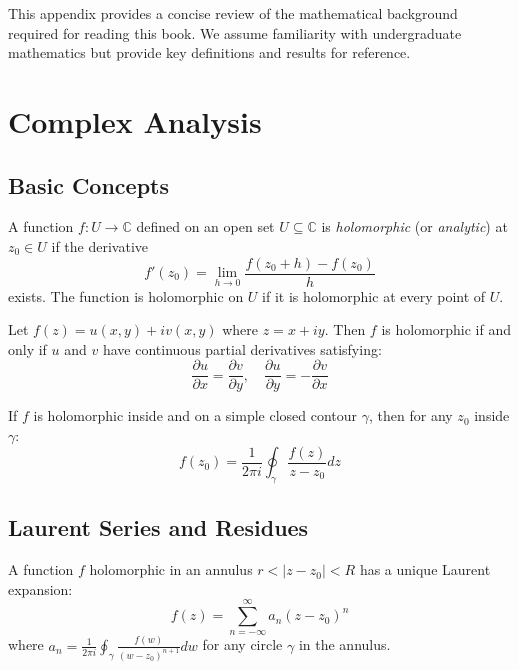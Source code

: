 
This appendix provides a concise review of the mathematical background required for reading this book. We assume familiarity with undergraduate mathematics but provide key definitions and results for reference.

\section{Complex Analysis}

\subsection{Basic Concepts}

\begin{definition}
A function $f: U \to \mathbb{C}$ defined on an open set $U \subseteq \mathbb{C}$ is \emph{holomorphic} (or \emph{analytic}) at $z_0 \in U$ if the derivative
\[
f'(z_0) = \lim_{h \to 0} \frac{f(z_0 + h) - f(z_0)}{h}
\]
exists. The function is holomorphic on $U$ if it is holomorphic at every point of $U$.
\end{definition}

\begin{theorem}
Let $f(z) = u(x,y) + iv(x,y)$ where $z = x + iy$. Then $f$ is holomorphic if and only if $u$ and $v$ have continuous partial derivatives satisfying:
\[
\frac{\partial u}{\partial x} = \frac{\partial v}{\partial y}, \quad \frac{\partial u}{\partial y} = -\frac{\partial v}{\partial x}
\]
\end{theorem}

\begin{theorem}
If $f$ is holomorphic inside and on a simple closed contour $\gamma$, then for any $z_0$ inside $\gamma$:
\[
f(z_0) = \frac{1}{2\pi i} \oint_{\gamma} \frac{f(z)}{z - z_0} dz
\]
\end{theorem}

\subsection{Laurent Series and Residues}

\begin{definition}
A function $f$ holomorphic in an annulus $r < |z - z_0| < R$ has a unique Laurent expansion:
\[
f(z) = \sum_{n=-\infty}^{\infty} a_n (z - z_0)^n
\]
where $a_n = \frac{1}{2\pi i} \oint_{\gamma} \frac{f(w)}{(w - z_0)^{n+1}} dw$ for any circle $\gamma$ in the annulus.
\end{definition}

